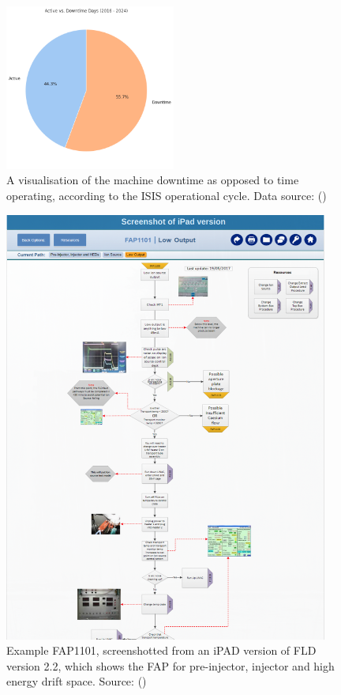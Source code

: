 \documentclass[10pt,oneside]{report}
\begin{document}
\begin{figure}[htbp]
    \centering
    \includegraphics[width=0.5\textwidth]{isisDowntime.png}
    \caption{A visualisation of the machine downtime as opposed to time operating, according to the ISIS operational cycle. Data source: (\citet{isisbeamoperations2024})}\label{fig:isisDowntime}
\end{figure}
\begin{figure}[htbp]
    \centering
    \includegraphics[width=0.95\textwidth]{fap.png}
    \caption{Example FAP1101, screenshotted from an iPAD version of FLD version 2.2, which shows the FAP for pre-injector, injector and high energy drift space. Source: (\citet{fld2017})}\label{fig:fap}
\end{figure}
\end{document}
